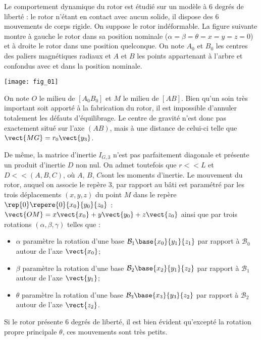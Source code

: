 \ifprof
\else
\begin{multicols}{2}
\fi


Le comportement dynamique du rotor est étudié sur un modèle à 6 degrés de
liberté : le rotor n'étant en contact avec aucun solide, il dispose des 6 mouvements
de corps rigide. On suppose le rotor indéformable. La figure suivante montre à
gauche le rotor dans sa position nominale ($\alpha=\beta=\theta=x=y=z=0$) et à droite le
rotor dans une position quelconque. On note $A_0$ et $B_0$ les centres des paliers
magnétiques radiaux et $A$ et $B$ les points appartenant à l'arbre et confondus
avec et dans la position nominale.

\begin{center}
\texttt{[image: fig\_01]}
\end{center}



On note $O$ le milieu de $\left[ A_0 B_0\right]$ et $M$ le milieu de $\left[ A B\right]$. Bien qu'un soin très
important soit apporté à la fabrication du rotor, il est impossible d'annuler totalement
les défauts d'équilibrage. Le centre de gravité n'est donc pas exactement
situé sur l'axe $(AB)$, mais à une distance de celui-ci telle que $\vect{MG}=r_0\vect{y_3}$.

De même, la matrice d'inertie $I_{G,3}$ n'est pas parfaitement diagonale et présente
un produit d'inertie $D$ non nul. On admet toutefois que $r<<L$ et $D<<(A,B,C)$,
où $A$, $B$, $C$sont les moments d’inertie. Le mouvement du rotor, auquel on associe
le repère 3, par rapport au bâti est paramétré par les trois déplacements $(x,y,z)$
du point $M$ dans le repère $\rep{0}\repere{0}{x_0}{y_0}{z_0}$ :  $\vect{OM}=x\vect{x_0}+y\vect{y_0}+z\vect{z_0}$ ainsi que par trois rotations $\left(\alpha,\beta,\gamma\right)$ telles que :

\begin{itemize}
\item $\alpha$ paramètre la rotation d'une base $\mathcal{B}_1\base{x_0}{y_1}{z_1}$ par rapport à $\mathcal{B}_0$ autour de l'axe $\vect{x_0}$;
\item $\beta$ paramètre la rotation d'une base $\mathcal{B}_2\base{x_2}{y_1}{z_2}$ par rapport à $\mathcal{B}_1$ autour de l'axe $\vect{y_1}$;
\item $\theta$ paramètre la rotation d'une base $\mathcal{B}_3\base{x_3}{y_3}{z_2}$ par rapport à $\mathcal{B}_2$ autour de l'axe $\vect{z_2}$.
\end{itemize}

Si le rotor présente 6 degrés de liberté, il est bien évident qu'excepté la rotation
propre principale $\theta$, ces mouvements sont très petits.


\end{multicols}
